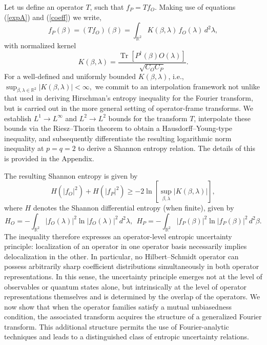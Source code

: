 \documentclass[aps,pra,onecolumn,nofootinbib,superscriptaddress,showpacs]{revtex4}
\begin{document}
Let us define an operator $T$, such that $f_P=Tf_O$. Making use of equations (\ref{expA}) and (\ref{coeff}) we write,
\begin{equation}
f_P(\beta)
=
(Tf_O)(\beta)
=
\int_{\mathbb R^2}
K(\beta,\lambda)\,
f_O(\lambda)\,
d^2\lambda,
\label{transform}
\end{equation}
with normalized kernel
\begin{equation}\label{kernel}
K(\beta,\lambda)
=
\frac{
\operatorname{Tr}
\!\left[
P^\dagger(\beta)O(\lambda)
\right]
}
{\sqrt{C_OC_P}}.
\end{equation}
For a well-defined and uniformly bounded $K(\beta,\lambda)$, i.e.,
$
\sup_{\beta,\lambda\in\mathbb R^2}
|K(\beta,\lambda)|
<\infty,
$
we commit to an interpolation framework not unlike that used in deriving
Hirschman's entropy inequality for the Fourier transform, but is carried
out in the more general setting of operator-frame transforms. We establish
$L^1\rightarrow L^\infty$ and $L^2\rightarrow L^2$ bounds for the
transform $T$, interpolate these bounds via the Riesz--Thorin theorem \cite{ReedSimon2} to
obtain a Hausdorff--Young-type inequality, and subsequently
differentiate the resulting logarithmic norm inequality at
$p=q=2$ to derive a Shannon entropy relation. The details of this is provided in the Appendix.

The resulting Shannon entropy is given by 
\begin{equation}
H(|f_O|^2)
+
H(|f_P|^2)
\ge
-2\ln \left[\sup_{\beta,\lambda}
|K(\beta,\lambda)|\right ],
\end{equation}
where
$H$ denotes the Shannon differential entropy (when finite), given by 
\begin{equation}\label{HP}
H_O
=
-\int_{\mathbb R^2}
|f_O(\lambda)|^2\ln |f_O(\lambda)|^2\,
d^2\lambda,~~
H_P
=
-\int_{\mathbb R^2}
|f_P(\beta)|^2\ln |f_P(\beta)|^2\,
d^2\beta.
\end{equation}
The inequality therefore expresses an operator-level
entropic uncertainty principle: localization of an operator
in one operator basis necessarily implies delocalization in
the other. In particular, no
Hilbert--Schmidt operator can possess arbitrarily sharp
coefficient distributions simultaneously in both operator representations. In this sense,
the uncertainty principle emerges not at the level of
observables or quantum states alone, but intrinsically at
the level of operator representations themselves and is determined by the overlap of the operators. We now show that when the operator families satisfy a mutual unbiasedness condition, the associated transform acquires the structure of a generalized Fourier transform. This additional structure permits the use of Fourier-analytic techniques and leads to a distinguished class of entropic uncertainty relations.
\end{document}

